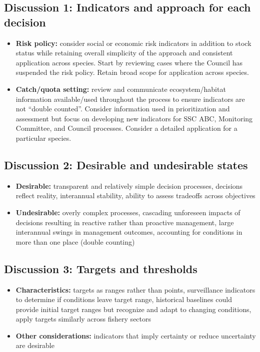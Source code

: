 \documentclass[
]{article}
\providecommand{\tightlist}{%
  \setlength{\itemsep}{0pt}\setlength{\parskip}{0pt}}
\begin{document}
\subsection{Discussion 1: Indicators and approach for each decision}\label{discussion-1-indicators-and-approach-for-each-decision}

\begin{itemize}
\tightlist
\item
  \textbf{Risk policy:} consider social or economic risk indicators in addition to stock status while retaining overall simplicity of the approach and consistent application across species. Start by reviewing cases where the Council has suspended the risk policy. Retain broad scope for application across species.
\item
  \textbf{Catch/quota setting:} review and communicate ecosystem/habitat information available/used throughout the process to ensure indicators are not ``double counted''. Consider information used in prioritization and assessment but focus on developing new indicators for SSC ABC, Monitoring Committee, and Council processes. Consider a detailed application for a particular species.
\end{itemize}

\subsection{Discussion 2: Desirable and undesirable states}\label{discussion-2-desirable-and-undesirable-states}

\begin{itemize}
\tightlist
\item
  \textbf{Desirable:} transparent and relatively simple decision processes, decisions reflect reality, interannual stability, ability to assess tradeoffs across objectives
\item
  \textbf{Undesirable:} overly complex processes, cascading unforeseen impacts of decisions resulting in reactive rather than proactive management, large interannual swings in management outcomes, accounting for conditions in more than one place (double counting)
\end{itemize}

\subsection{Discussion 3: Targets and thresholds}\label{discussion-3-targets-and-thresholds}

\begin{itemize}
\tightlist
\item
  \textbf{Characteristics:} targets as ranges rather than points, surveillance indicators to determine if conditions leave target range, historical baselines could provide initial target ranges but recognize and adapt to changing conditions, apply targets similarly across fishery sectors
\item
  \textbf{Other considerations:} indicators that imply certainty or reduce uncertainty are desirable
\end{itemize}
\end{document}
